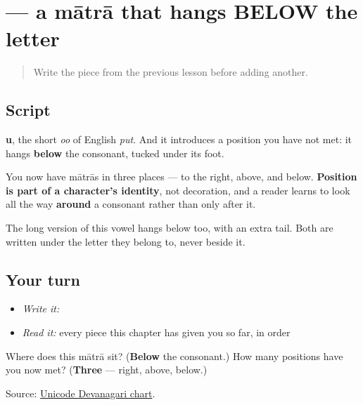 \section[\texorpdfstring{\hi{ु} (-u)}{ु (-u)}]{ — a mātrā that hangs BELOW the letter}

\label{lesson:HI-W12-u-matra}



\begin{quote}
Write the piece from the previous lesson before adding another.
\end{quote}

\subsection*{Script}

\begin{quote}
\end{quote}

\textbf{u}, the short \emph{oo} of English \emph{put}. And it introduces a position you have not met: it hangs \textbf{below} the consonant, tucked under its foot.

You now have mātrās in three places — to the right, above, and below. \textbf{Position is part of a character's identity}, not decoration, and a reader learns to look all the way \textbf{around} a consonant rather than only after it.

The long version of this vowel hangs below too, with an extra tail. Both are written under the letter they belong to, never beside it.

\subsection*{Your turn}
\begin{itemize}
\raggedright
  \item \emph{Write it:} 
  \item \emph{Read it:} every piece this chapter has given you so far, in order
\end{itemize}

\begin{tcolorbox}[breakable,colback=teal!4,colframe=teal!35!black,title={Before you move on}]
Where does this mātrā sit? (\textbf{Below} the consonant.) How many positions have you now met? (\textbf{Three} — right, above, below.)

Source: \href{https://www.unicode.org/charts/PDF/U0900.pdf}{Unicode Devanagari chart}.
\end{tcolorbox}
